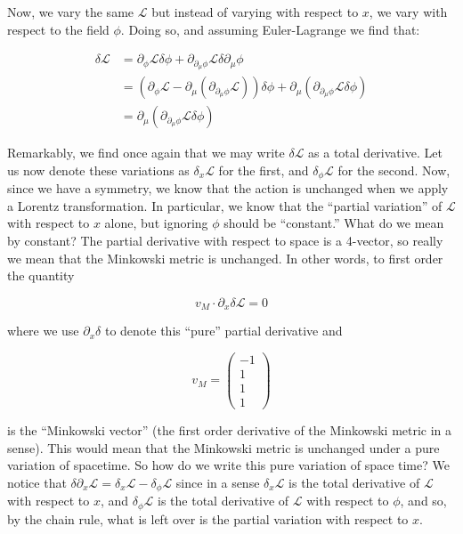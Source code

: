 \documentclass{article}
\theoremstyle{definition}
\begin{document}
Now, we vary the same $\mathcal{L}$ but instead of varying with respect to $x$,
we vary with respect to the field $\phi$. Doing so, and assuming Euler-Lagrange
we find that:

\begin{align*}
  \delta \mathcal{L}
  &= \partial_\phi \mathcal{L} \delta \phi + \partial_{\partial_\mu \phi} \mathcal{L} \delta \partial_\mu \phi \\
  &= (\partial_\phi \mathcal{L} - \partial_\mu (\partial_{\partial_\mu \phi} \mathcal{L})) \delta \phi + \partial_\mu (\partial_{\partial_\mu \phi} \mathcal{L} \delta \phi) \\
  &= \partial_\mu (\partial_{\partial_\mu \phi} \mathcal{L} \delta \phi)
\end{align*}

Remarkably, we find once again that we may write $\delta \mathcal{L}$ as a total
derivative. Let us now denote these variations as $\delta_x \mathcal{L}$ for the
first, and $\delta_\phi \mathcal{L}$ for the second. Now, since we have a
symmetry, we know that the action is unchanged when we apply a Lorentz
transformation. In particular, we know that the ``partial variation'' of
$\mathcal{L}$ with respect to $x$ alone, but ignoring $\phi$ should be
``constant.'' What do we mean by constant? The partial derivative with respect
to space is a 4-vector, so really we mean that the Minkowski metric is
unchanged. In other words, to first order the quantity

$$ v_M \cdot \partial_x \delta \mathcal{L} = 0 $$

where we use $\partial_x \delta$ to denote this ``pure'' partial derivative and

$$
v_M =
\begin{pmatrix}
  -1 \\
  1 \\
  1 \\
  1
\end{pmatrix}
$$

is the ``Minkowski vector'' (the first order derivative of the Minkowski metric
in a sense). This would mean that the Minkowski metric is unchanged under a pure
variation of spacetime. So how do we write this pure variation of space time?
We notice that $\delta \partial_x \mathcal{L} = \delta_x \mathcal{L} -
\delta_\phi \mathcal{L}$ since in a sense $\delta_x \mathcal{L}$ is the total
derivative of $\mathcal{L}$ with respect to $x$, and $\delta_\phi \mathcal{L}$
is the total derivative of $\mathcal{L}$ with respect to $\phi$, and so, by the
chain rule, what is left over is the partial variation with respect to $x$.
\end{document}
